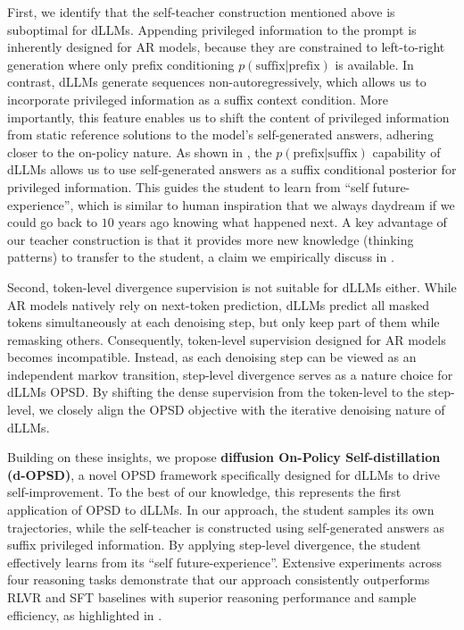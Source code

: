 \documentclass{article}
\begin{document}
First, we identify that the self-teacher construction mentioned above is suboptimal for dLLMs. Appending privileged information to the prompt is inherently designed for AR models, because they are constrained to left-to-right generation where only prefix conditioning $p(\text{suffix} | \text{prefix})$ is available. In contrast, dLLMs generate sequences non-autoregressively, which allows us to incorporate privileged information as a suffix context condition. More importantly, this feature enables us to shift the content of privileged information from static reference solutions to the model's self-generated answers, adhering closer to the on-policy nature. As shown in , the $p(\text{prefix} | \text{suffix})$ capability of dLLMs allows us to use self-generated answers as a suffix conditional posterior for privileged information. This guides the student to learn from ``self future-experience'', which is similar to human inspiration that we always daydream if we could go back to $10$ years ago knowing what happened next. A key advantage of our teacher construction is that it provides more new knowledge (thinking patterns) to transfer to the student, a claim we empirically discuss in .

Second, token-level divergence supervision is not suitable for dLLMs either. While AR models natively rely on next-token prediction, dLLMs predict all masked tokens simultaneously at each denoising step, but only keep part of them while remasking others. Consequently, token-level supervision designed for AR models becomes incompatible. Instead, as each denoising step can be viewed as an independent markov transition, step-level divergence serves as a nature choice for dLLMs OPSD. By shifting the dense supervision from the token-level to the step-level, we closely align the OPSD objective with the iterative denoising nature of dLLMs.

Building on these insights, we propose \textbf{diffusion On-Policy Self-distillation (d-OPSD)}, a novel OPSD framework specifically designed for dLLMs to drive self-improvement. To the best of our knowledge, this represents the first application of OPSD to dLLMs. In our approach, the student samples its own trajectories, while the self-teacher is constructed using self-generated answers as suffix privileged information. By applying step-level divergence, the student effectively learns from its ``self future-experience''. Extensive experiments across four reasoning tasks demonstrate that our approach consistently outperforms RLVR and SFT baselines with superior reasoning performance and sample efficiency, as highlighted in .
\end{document}
